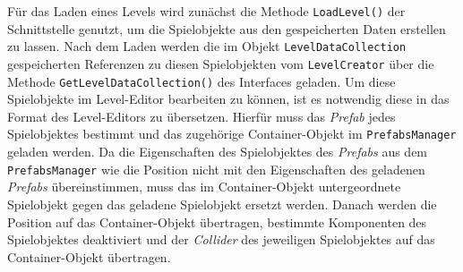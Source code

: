 Für das Laden eines Levels wird zunächst die Methode \texttt{LoadLevel()} der Schnittstelle genutzt, um die Spielobjekte aus den gespeicherten Daten erstellen zu lassen. Nach dem Laden werden die im Objekt \texttt{LevelDataCollection} gespeicherten Referenzen zu diesen Spielobjekten vom \texttt{LevelCreator} über die Methode \texttt{GetLevelDataCollection()} des Interfaces geladen. Um diese Spielobjekte im Level-Editor bearbeiten zu können, ist es notwendig diese in das Format des Level-Editors zu übersetzen. Hierfür muss das \textit{Prefab} jedes Spielobjektes bestimmt und das zugehörige Container-Objekt im \texttt{PrefabsManager} geladen werden. Da die Eigenschaften des Spielobjektes des \textit{Prefabs} aus dem \texttt{PrefabsManager} wie die Position nicht mit den Eigenschaften des geladenen \textit{Prefabs} übereinstimmen, muss das im Container-Objekt untergeordnete Spielobjekt gegen das geladene Spielobjekt ersetzt werden. Danach werden die Position auf das Container-Objekt übertragen, bestimmte Komponenten des Spielobjektes deaktiviert und der \textit{Collider} des jeweiligen Spielobjektes auf das Container-Objekt übertragen.
